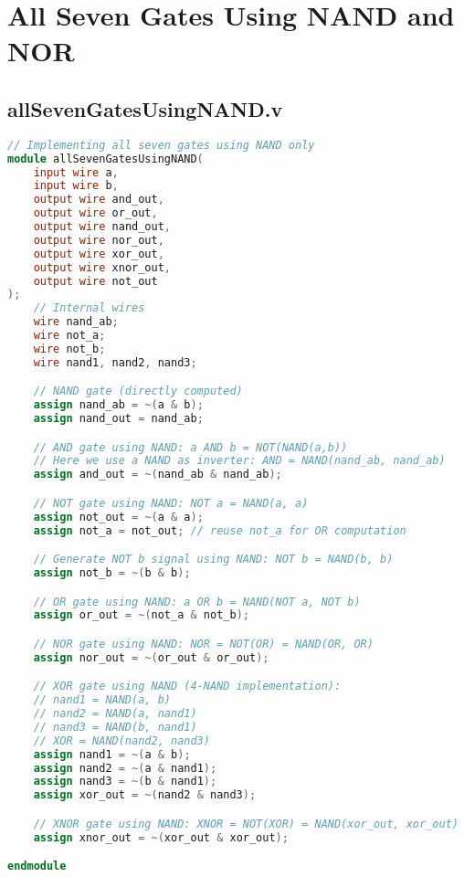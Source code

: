 \documentclass[a4paper,12pt]{article}
\begin{document}
\newpage

\section*{All Seven Gates Using NAND and NOR}

\subsection*{allSevenGatesUsingNAND.v}
\begin{lstlisting}[language=Verilog, caption=allSevenGatesUsingNAND.v]
// Implementing all seven gates using NAND only
module allSevenGatesUsingNAND(
    input wire a,
    input wire b,
    output wire and_out,
    output wire or_out,
    output wire nand_out,
    output wire nor_out,
    output wire xor_out,
    output wire xnor_out,
    output wire not_out
);
    // Internal wires
    wire nand_ab;
    wire not_a;
    wire not_b;
    wire nand1, nand2, nand3;

    // NAND gate (directly computed)
    assign nand_ab = ~(a & b);
    assign nand_out = nand_ab;

    // AND gate using NAND: a AND b = NOT(NAND(a,b))
    // Here we use a NAND as inverter: AND = NAND(nand_ab, nand_ab)
    assign and_out = ~(nand_ab & nand_ab);

    // NOT gate using NAND: NOT a = NAND(a, a)
    assign not_out = ~(a & a);
    assign not_a = not_out; // reuse not_a for OR computation

    // Generate NOT b signal using NAND: NOT b = NAND(b, b)
    assign not_b = ~(b & b);

    // OR gate using NAND: a OR b = NAND(NOT a, NOT b)
    assign or_out = ~(not_a & not_b);

    // NOR gate using NAND: NOR = NOT(OR) = NAND(OR, OR)
    assign nor_out = ~(or_out & or_out);

    // XOR gate using NAND (4-NAND implementation):
    // nand1 = NAND(a, b)
    // nand2 = NAND(a, nand1)
    // nand3 = NAND(b, nand1)
    // XOR = NAND(nand2, nand3)
    assign nand1 = ~(a & b);
    assign nand2 = ~(a & nand1);
    assign nand3 = ~(b & nand1);
    assign xor_out = ~(nand2 & nand3);

    // XNOR gate using NAND: XNOR = NOT(XOR) = NAND(xor_out, xor_out)
    assign xnor_out = ~(xor_out & xor_out);

endmodule

\end{lstlisting}
\end{document}
